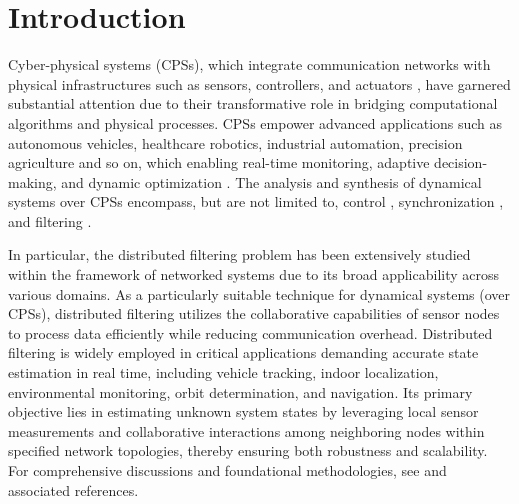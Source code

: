 \documentclass[twocolumn]{IEEEtran}
\begin{document}
\section{Introduction}
Cyber-physical systems (CPSs), which integrate communication networks with physical infrastructures such as sensors, controllers, and actuators \cite{xing2023optimal}, have garnered substantial attention due to their transformative role in bridging computational algorithms and physical processes. CPSs empower advanced applications such as autonomous vehicles, healthcare robotics, industrial automation, precision agriculture and so on, which enabling real-time monitoring, adaptive decision-making, and dynamic optimization \cite{schutze2018sensors}. The analysis and synthesis of dynamical systems over CPSs encompass, but are not limited to, control \cite{ji2023adaptive, xi2025expert, priya2025dynamic}, synchronization \cite{zhang2024synchronization, hannon2021distributed}, and filtering \cite{jin2023distributed, li2024improving, xing2022dynamic, zheng2022distributed}.

In particular, the distributed filtering problem has been extensively studied within the framework of networked systems due to its broad applicability across various domains. As a particularly suitable technique for dynamical systems (over CPSs), distributed filtering utilizes the collaborative capabilities of sensor nodes to process data efficiently while reducing communication overhead. Distributed filtering is widely employed in critical applications demanding accurate state estimation in real time, including vehicle tracking, indoor localization, environmental monitoring, orbit determination, and navigation. Its primary objective lies in estimating unknown system states by leveraging local sensor measurements and collaborative interactions among neighboring nodes within specified network topologies, thereby ensuring both robustness and scalability. For comprehensive discussions and foundational methodologies, see \cite{zhou2024finite, song2024robust, li2024distributed, fu2024distributed, feng2022enhanced} and associated references.
\end{document}
